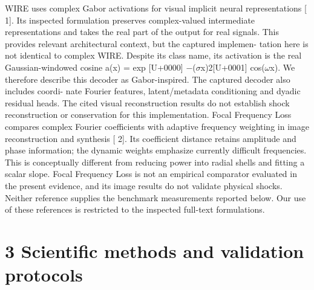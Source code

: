 \documentclass[11pt]{article}
\begin{document}
WIRE uses complex Gabor activations for visual implicit neural representations [ 1]. Its inspected
formulation preserves complex-valued intermediate representations and takes the real part of the
output for real signals. This provides relevant architectural context, but the captured implemen-
tation here is not identical to complex WIRE. Despite its class name, its activation is the real
Gaussian-windowed cosine
a(x) = exp
[U+0000]
\ensuremath{-}(\ensuremath{\sigma}x)2[U+0001]
cos(\ensuremath{\omega}x).
We therefore describe this decoder as Gabor-inspired. The captured decoder also includes coordi-
nate Fourier features, latent/metadata conditioning and dyadic residual heads. The cited visual
reconstruction results do not establish shock reconstruction or conservation for this implementation.
Focal Frequency Loss compares complex Fourier coefficients with adaptive frequency weighting
in image reconstruction and synthesis [ 2]. Its coefficient distance retains amplitude and phase
information; the dynamic weights emphasize currently difficult frequencies. This is conceptually
different from reducing power into radial shells and fitting a scalar slope. Focal Frequency Loss is
not an empirical comparator evaluated in the present evidence, and its image results do not validate
physical shocks. Neither reference supplies the benchmark measurements reported below. Our use
of these references is restricted to the inspected full-text formulations.

\section*{3 Scientific methods and validation protocols}
\end{document}
